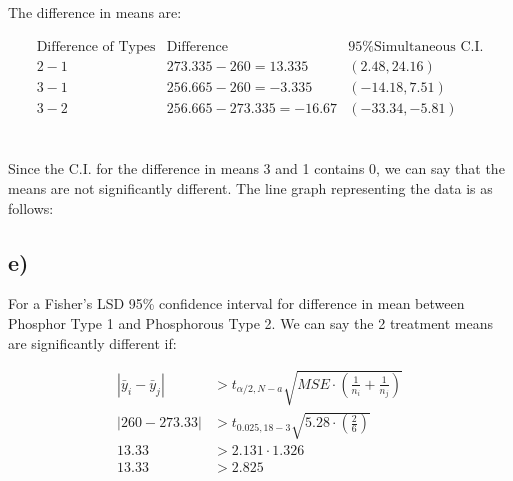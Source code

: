 \documentclass{article}
\begin{document}
\begin{flushleft}
    The difference in means are:
\end{flushleft}
\begin{equation*}
    \begin{array}{c|c|c}
        \text{Difference of Types} &\text{Difference}&95\% \text{Simultaneous C.I.}\\
        \hline
        2 - 1 & 273.335 - 260 = 13.335 & (2.48, 24.16)\\
        3 - 1 & 256.665 - 260 = -3.335 & (-14.18, 7.51)\\
        3 - 2 & 256.665 - 273.335 = -16.67 & (-33.34, -5.81)\\
    
    \end{array}
    \end{equation*}\\
\begin{flushleft}
    Since the C.I. for the difference in means 3 and 1 contains 0, we can say that the means are not significantly different. The line graph representing the data is as follows:
\end{flushleft}


\subsection*{e)}
For a Fisher's LSD 95\% confidence
interval for difference in mean between Phosphor Type 1 and Phosphorous Type 2.
We can say the 2 treatment means are significantly different if:

\begin{align*}
    \left| \bar{y}_{i} - \bar{y}_{j} \right| &> t_{\alpha/2, N-a} \sqrt{MSE \cdot \left( \frac{1}{n_i} + \frac{1}{n_j} \right)} \\
    \left| 260 - 273.33 \right|  &> t_{0.025, 18-3} \sqrt{5.28 \cdot \left( \frac{2}{6} \right)} \\
    13.33 &> 2.131 \cdot 1.326 \\
    13.33 &> 2.825
\end{align*}
\end{document}
